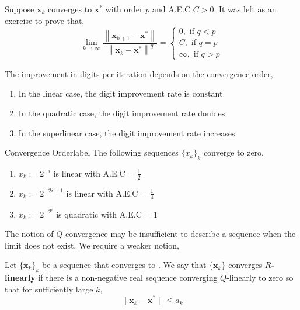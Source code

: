 \begin{rmk}
\sloppy Suppose $\mathbf{x}_k$ converges to $\mathbf{x}^*$ with order $p$ and A.E.C $C > 0$. It was left as an exercise to prove that,
    \begin{equation}
    \lim _{k \rightarrow \infty} \frac{\left\|\mathbf{x}_{k+1}-\mathbf{x}^*\right\|}{\left\|\mathbf{x}_k-\mathbf{x}^*\right\|^q}=\left\{\begin{array}{c}
    0, \text { if } q<p \\
    C, \text { if } q=p \\
    \infty, \text { if } q>p
    \end{array}\right.
    \end{equation}
    
\end{rmk}
\begin{marginfigure}
     The improvement in digits per iteration depends on the convergence order,
     \begin{enumerate}
         \item In the linear case, the digit improvement rate is constant
         \item In the quadratic case, the digit improvement rate doubles
         \item In the superlinear case, the digit improvement rate increases
     \end{enumerate}
\end{marginfigure}

\begin{ex}{Convergence Order}{label}
    The following sequences $\{x_k\}_k$ converge to zero,
    \begin{enumerate}
        \item $x_k := 2^{-i}$ is linear with A.E.C = $\frac{1}{2}$
        \item $x_k := 2^{-2i+1}$ is linear with A.E.C = $\frac{1}{4}$
        \item $x_k := 2^{-2^i}$ is quadratic with A.E.C = $1$
    \end{enumerate}
\end{ex}

\noindent The notion of $Q$-convergence may be insufficient to describe a sequence when the limit does not exist. We require a weaker notion,

\begin{defn}
    \sloppy Let $\{\mathbf{x}_k\}_k$ be a sequence that converges to .
    We say that $\{\mathbf{x}_k\}$ converges \textbf{$R$-linearly} if there is a non-negative real sequence  converging $Q$-linearly to zero so that for sufficiently large $k$,
    \[\|\mathbf{x}_k - \mathbf{x}^*\| \leq a_k\]
\end{defn}

